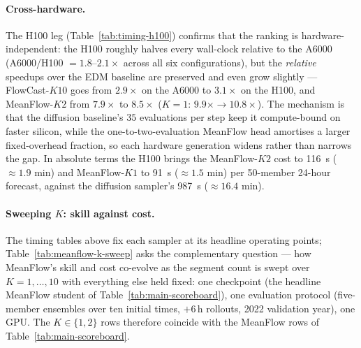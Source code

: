 \paragraph{Cross-hardware.} The H100 leg (Table~\ref{tab:timing-h100}) confirms that the ranking is hardware-independent: the H100 roughly halves every wall-clock relative to the A6000 (A6000/H100 $= 1.8$--$2.1\times$ across all six configurations), but the \emph{relative} speedups over the EDM baseline are preserved and even grow slightly --- FlowCast-$K10$ goes from $2.9\times$ on the A6000 to $3.1\times$ on the H100, and MeanFlow-$K2$ from $7.9\times$ to $8.5\times$ ($K = 1$: $9.9\times \to 10.8\times$). The mechanism is that the diffusion baseline's $35$ evaluations per step keep it compute-bound on faster silicon, while the one-to-two-evaluation MeanFlow head amortises a larger fixed-overhead fraction, so each hardware generation widens rather than narrows the gap. In absolute terms the H100 brings the MeanFlow-$K2$ cost to \SI{116}{\second} ($\approx 1.9$ min) and MeanFlow-$K1$ to \SI{91}{\second} ($\approx 1.5$ min) per 50-member 24-hour forecast, against the diffusion sampler's \SI{987}{\second} ($\approx 16.4$ min).

\paragraph{Sweeping $K$: skill against cost.} The timing tables above fix each sampler at its headline operating points; Table~\ref{tab:meanflow-k-sweep} asks the complementary question --- how MeanFlow's skill and cost co-evolve as the segment count is swept over $K = 1, \dots, 10$ with everything else held fixed: one checkpoint (the headline MeanFlow student of Table~\ref{tab:main-scoreboard}), one evaluation protocol (five-member ensembles over ten initial times, $+6$\,h rollouts, 2022 validation year), one GPU. The $K \in \{1, 2\}$ rows therefore coincide with the MeanFlow rows of Table~\ref{tab:main-scoreboard}.

